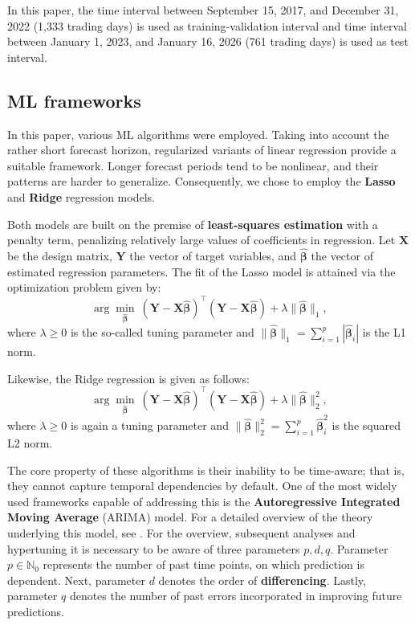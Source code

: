 \documentclass{svk_en}
\begin{document}
In this paper, the time interval between September 15, 2017, and December 31, 2022 (1,333 trading days) is used as training-validation interval
and time interval between January 1, 2023, and January 16, 2026 (761 trading days) is used as test interval.

\subsection{ML frameworks}
In this paper, various ML algorithms were employed. Taking into account the rather 
short forecast horizon, regularized variants of linear regression provide a suitable framework.
Longer forecast periods tend to be nonlinear, and their patterns are harder to generalize. Consequently, 
we chose to employ the \textbf{Lasso} and \textbf{Ridge} regression models.

Both models are built on the premise of \textbf{least-squares estimation} with a penalty term, penalizing relatively large values of coefficients in regression. Let $\mathbf{X}$ be the design matrix, $\mathbf{Y}$ the vector of target variables, and $\bm{\hat{\beta}}$ the vector of estimated regression parameters. 
The fit of the Lasso model is attained via the optimization problem given by:
\begin{equation}
    \arg \min_{\bm{\hat{\beta}}} \> (\mathbf{Y} - \textbf{X}\bm{\hat{\beta}})^\top(\mathbf{Y} - \textbf{X}\bm{\hat{\beta}}) + \lambda \|\bm{\hat{\beta}}\|_1,
\end{equation}
where $\lambda \geq 0$ is the so-called tuning parameter and $\|\bm{\hat{\beta}}\|_1 = \sum_{i=1}^{p} |\bm{\hat{\beta}}_{i}|$ is the L1 norm.

Likewise, the Ridge regression is given as follows:
\begin{equation}
    \arg \min_{\bm{\hat{\beta}}} \> (\mathbf{Y} - \textbf{X}\bm{\hat{\beta}})^\top(\mathbf{Y} - \textbf{X}\bm{\hat{\beta}}) + \lambda \|\bm{\hat{\beta}}\|_2^2,
\end{equation}
where $\lambda \geq 0$ is again a tuning parameter and $\|\bm{\hat{\beta}}\|_2^2 = \sum_{i=1}^{p}\bm{\hat{\beta}}^2_{i}$ is the squared L2 norm.

The core property of these algorithms is their inability to be time-aware; that is, they cannot capture temporal
dependencies by default. One of the most widely used frameworks capable of addressing this is the \textbf{Autoregressive Integrated Moving Average} (ARIMA) model. %
For a detailed overview of the theory underlying this model, see \cite{forecast_book}. For the overview, subsequent analyses and hypertuning it is necessary to be aware of three parameters $p, d, q$.
Parameter $p \in \mathbb{N}_0$ represents the number of past time points, on which prediction is dependent. Next, parameter $d$ denotes the order of \textbf{differencing}. Lastly, parameter $q$ denotes the number of past errors
incorporated in improving future predictions.  
\end{document}

